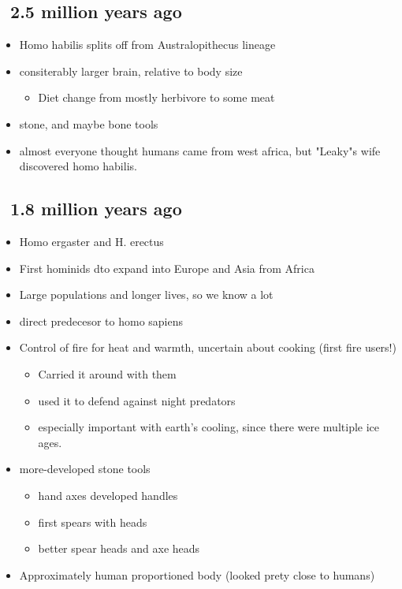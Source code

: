 \documentclass{article}
\theoremstyle{definition}
\begin{document}
\subsection{~2.5 million years ago}
\begin{itemize}
	\item Homo habilis splits off from Australopithecus lineage
	\item consiterably larger brain, relative to body size
		\begin{itemize}
			\item Diet change from mostly herbivore to some meat
		\end{itemize}
	\item stone, and maybe bone tools
	\item almost everyone thought humans came from west africa, but "Leaky"s wife discovered homo habilis.
\end{itemize}

\subsection{~1.8 million years ago}
\begin{itemize}
	\item Homo ergaster and H. erectus
	\item First hominids dto expand into Europe and Asia from Africa
	\item Large populations and longer lives, so we know a lot
	\item direct predecesor to homo sapiens
	\item Control of fire for heat  and warmth, uncertain about cooking (first fire users!)
		\begin{itemize}
			\item Carried it around with them
			\item used it to defend against night predators
			\item especially important with earth's cooling, since there were multiple ice ages.
		\end{itemize}
	\item more-developed stone tools
		\begin{itemize}
			\item hand axes developed handles
			\item first spears with heads
			\item better spear heads and axe heads
		\end{itemize}
	\item Approximately human proportioned body (looked prety close to humans)
\end{itemize}
\end{document}
